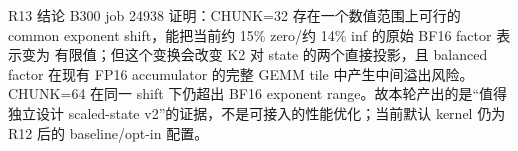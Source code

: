 \begin{record}{R13 结论}
B300 job 24938 证明：CHUNK=32 存在一个数值范围上可行的 common exponent
shift，能把当前约 15\% zero/约 14\% inf 的原始 BF16 factor 表示变为
有限值；但这个变换会改变 K2 对 state 的两个直接投影，且 balanced factor
在现有 FP16 accumulator 的完整 GEMM tile 中产生中间溢出风险。CHUNK=64
在同一 shift 下仍超出 BF16 exponent range。故本轮产出的是“值得独立设计
scaled-state v2”的证据，不是可接入的性能优化；当前默认 kernel 仍为
R12 后的 baseline/opt-in 配置。
\end{record}
